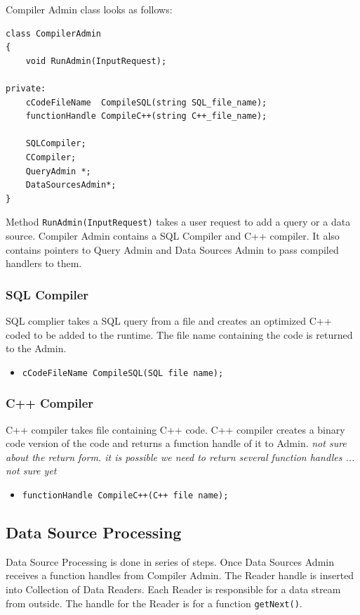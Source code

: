 \documentclass[11pt]{article}
\begin{document}
\noindent Compiler Admin class looks as follows:
\begin{verbatim}
class CompilerAdmin
{
    void RunAdmin(InputRequest);

private:
    cCodeFileName  CompileSQL(string SQL_file_name);
    functionHandle CompileC++(string C++_file_name);
	
    SQLCompiler;
    CCompiler;
    QueryAdmin *;
    DataSourcesAdmin*;
}
\end{verbatim}

Method {\tt RunAdmin(InputRequest)} takes a user request to add a query or a data source. Compiler Admin contains a SQL Compiler and C++ compiler. It also contains pointers to Query Admin and Data Sources Admin to pass compiled handlers to them.

\subsubsection{SQL Compiler}

SQL complier takes a SQL query from a file and creates an optimized C++ coded to be added to the runtime. The file name containing the code is returned to the Admin.

\begin{itemize}
	\item {\tt cCodeFileName CompileSQL(SQL file name);}
\end{itemize}

\subsubsection{C++ Compiler}

C++ compiler takes file containing C++ code. C++ compiler creates a binary code version of the code and returns a function handle of it to Admin. \emph{not sure about the return form. it is possible we need to return several function handles ... not sure yet}

\begin{itemize}
	\item {\tt functionHandle CompileC++(C++ file name);}
\end{itemize}

\subsection{Data Source Processing}

Data Source Processing is done in series of steps. Once Data Sources Admin receives a function handles from Compiler Admin. The Reader handle is inserted into Collection of Data Readers. Each Reader is responsible for a data stream from outside. The handle for the Reader is for a function {\tt getNext()}.
\end{document}
